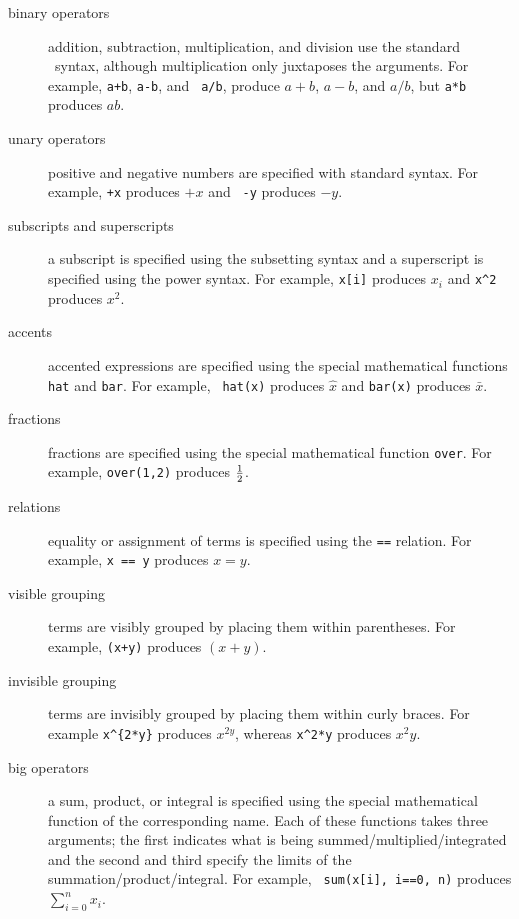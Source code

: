 \begin{description}
\item[binary operators]  addition, subtraction, multiplication, and
division use the standard \R\ syntax, although multiplication only
juxtaposes the arguments.  For example, {\tt a+b}, {\tt a-b}, and {\tt
a/b}, produce $a+b$, $a-b$, and $a/b$, but {\tt a*b} produces $ab$.

\item[unary operators]  positive and negative numbers are specified
with standard syntax.  For example, {\tt +x} produces $+x$ and {\tt
-y} produces $-y$.

\item[subscripts and superscripts]  a subscript is specified
using the subsetting syntax and a superscript is specified using
the power syntax.  For example, {\tt x[i]} produces
$x_i$ and {\tt x\^{}2} produces $x^2$.

\item[accents] accented expressions are specified using the special
mathematical functions {\tt hat} and {\tt bar}.  For example, {\tt
hat(x)} produces $\hat x$ and {\tt bar(x)} produces $\bar x$.

\item[fractions] fractions are specified using the special
mathematical function {\tt over}. For example, {\tt over(1,2)}
produces $1\over2$.

\item[relations]  equality or assignment of terms is specified using
the {\tt ==} relation.  For example, {\tt x == y} produces $x=y$.

\item[visible grouping]  terms are visibly grouped by placing them
within parentheses.  For example, {\tt (x+y)} produces $(x+y)$.

\item[invisible grouping]  terms are invisibly grouped by placing
them within curly braces. For example \verb|x^{2*y}| produces
$x^{2y}$, whereas {\tt x\^{}2*y} produces $x^2y$.

\item[big operators]  a sum, product, or integral is specified using
the special mathematical function of the corresponding name.  Each
of these functions takes three arguments;  the first indicates what
is being summed/multiplied/integrated and the second and third specify
the limits of the summation/product/integral.  For example, {\tt
sum(x[i], i==0, n)} produces $\sum\limits_{i=0}^n x_i$.


\end{description}
